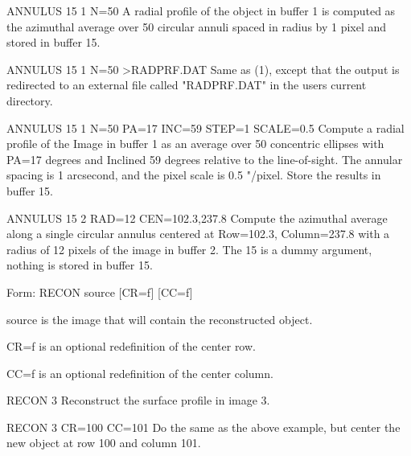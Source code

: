 {\newpage\clearpage
{}%
\begin{example}
  \item[ANNULUS 15 1 N=50\hfill]{A radial profile of the object in buffer 1
       is computed as the azimuthal average over 50 circular annuli spaced
       in radius by 1 pixel and stored in buffer 15.}
\par\item[ANNULUS 15 1 N=50 >RADPRF.DAT\hfill]{Same as (1), except that the
       output is redirected to an external file called "RADPRF.DAT" in the
       users current directory.}
\par\item[ANNULUS 15 1 N=50 PA=17 INC=59 STEP=1 SCALE=0.5\hfill]{Compute a
       radial profile of the Image in buffer 1 as an average over 50
       concentric ellipses with PA=17 degrees and Inclined 59 degrees
       relative to the line-of-sight.  The annular spacing is 1 arcsecond,
       and the pixel scale is 0.5 "/pixel.  Store the results in buffer
       15.}
\par\item[ANNULUS 15 2 RAD=12 CEN=102.3,237.8\hfill]{Compute the azimuthal
       average along a single circular annulus centered at Row=102.3,
       Column=237.8 with a radius of 12 pixels of the image in buffer 2.
       The 15 is a dummy argument, nothing is stored in buffer 15.}
\end{example}%
\lthtmlfigureZ
\lthtmlcheckvsize\clearpage}

{\newpage\clearpage
{}%
\begin{command}
  \item[Form: RECON source {[CR=f]} {[CC=f]}\hfill]{}
  \item[source]{is the image that will contain the reconstructed object.}
  \item[CR=f]{is an optional redefinition of the center row.}
  \item[CC=f]{is an optional redefinition of the center column.}
\end{command}%
\lthtmlfigureZ
\lthtmlcheckvsize\clearpage}

{\newpage\clearpage
{}%
\begin{example}
  \item[RECON 3\hfill]{Reconstruct the surface profile in image 3.}
\par\item[RECON 3 CR=100 CC=101\hfill]{Do the same as the above example,
       but center the new object at row 100 and column 101.}
\end{example}%
\lthtmlfigureZ
\lthtmlcheckvsize\clearpage}

